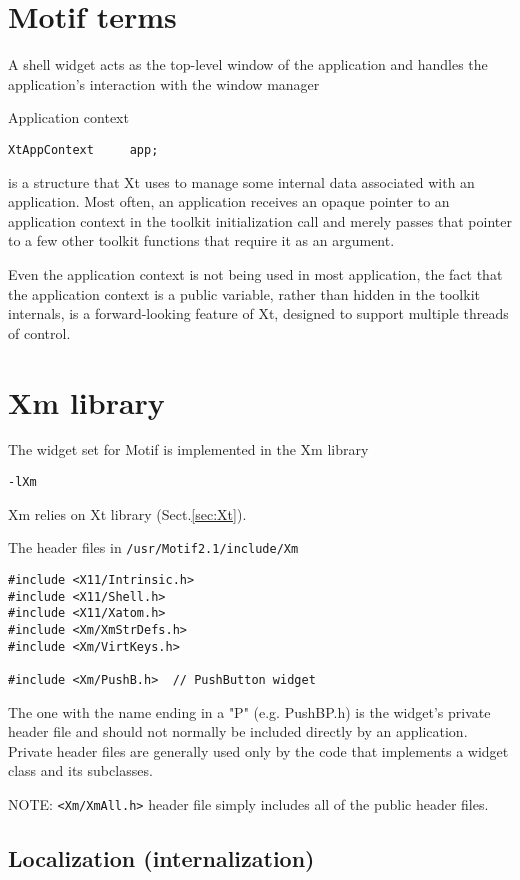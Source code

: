 \section{Motif terms}
\label{sec:Motif_terms}

A shell widget acts as the top-level window of the application and handles the
application's interaction with the window manager

Application context
\begin{verbatim}
XtAppContext     app;
\end{verbatim}
is a structure that Xt uses to manage some internal data associated with an
application. Most often, an application receives an opaque pointer to an application context
in the toolkit initialization call and merely passes that pointer to a few other toolkit functions that require it as an argument. 

Even the application context is not being used in most application, the fact
that the application context is a public variable, rather than hidden in the
toolkit internals, is a forward-looking feature of Xt, designed to support
multiple threads of control.

\section{Xm library}
\label{sec:Xm}

The widget set for Motif is implemented in the Xm library
\begin{verbatim}
-lXm
\end{verbatim}
Xm relies on Xt library (Sect.\ref{sec:Xt}).

The header files in \verb!/usr/Motif2.1/include/Xm!
\begin{verbatim}
#include <X11/Intrinsic.h>
#include <X11/Shell.h>
#include <X11/Xatom.h>
#include <Xm/XmStrDefs.h>
#include <Xm/VirtKeys.h>

#include <Xm/PushB.h>  // PushButton widget
\end{verbatim} 
The one with the name ending in a "P" (e.g. PushBP.h) is the widget's private
header file and should not normally be included directly by an application.
Private header files are generally used only by the code that implements a
widget class and its subclasses.

NOTE: \verb!<Xm/XmAll.h>! header file simply includes all of the public
header files.

\subsection{Localization (internalization)}


